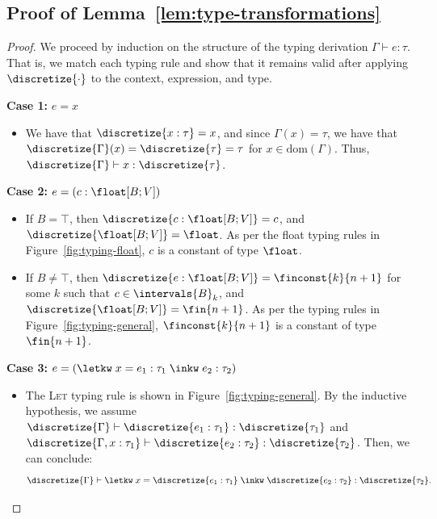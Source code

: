 \subsection{Proof of Lemma~\ref{lem:type-transformations}}
\begin{proof}
    We proceed by induction on the structure of the typing derivation $\Gamma \vdash e : \tau$. That is, we match each typing rule and show that it remains valid after applying $\discretize{\cdot}$ to the context, expression, and type.
    
    \textbf{Case 1:} $e = x$
    \begin{itemize}
        \item We have that $\discretize{x : \tau} = x$, and since $\Gamma(x) = \tau$, we have that $\discretize{\Gamma}(x) = \discretize{\tau} = \tau$ for $x \in \text{dom}(\Gamma)$. Thus, $\discretize{\Gamma} \vdash x : \discretize{\tau}$.
    \end{itemize}

    \textbf{Case 2:} $e = (c : \float[B;V])$
    \begin{itemize}
        \item If $B = \top$, then $\discretize{c : \float[B;V]} = c$, and $\discretize{\float[B;V]} = \float$. As per the float typing rules in Figure~\ref{fig:typing-float}, $c$ is a constant of type $\float$.
        \item If $B \neq \top$, then $\discretize{e : \float[B;V]} = \finconst{k}{n+1}$ for some $k$ such that $c \in \intervals{B}_k$, and $\discretize{\float[B;V]} = \fin{n+1}$. As per the typing rules in Figure~\ref{fig:typing-general}, $\finconst{k}{n+1}$ is a constant of type $\fin{n+1}$.
    \end{itemize}

    \textbf{Case 3:} $e = (\letkw \; x = e_1 : \tau_1 \; \inkw \; e_2 : \tau_2)$
    \begin{itemize}
        \item The \textsc{Let} typing rule is shown in Figure~\ref{fig:typing-general}. By the inductive hypothesis, we assume $\discretize{\Gamma} \vdash \discretize{e_1 : \tau_1} : \discretize{\tau_1}$ and $\discretize{\Gamma, x : \tau_1} \vdash \discretize{e_2 : \tau_2} : \discretize{\tau_2}$. Then, we can conclude:
        \[ \discretize{\Gamma} \vdash \letkw \; x = \discretize{e_1 : \tau_1} \; \inkw \; \discretize{e_2 : \tau_2} : \discretize{\tau_2}. \]
    \end{itemize}


\end{proof}
